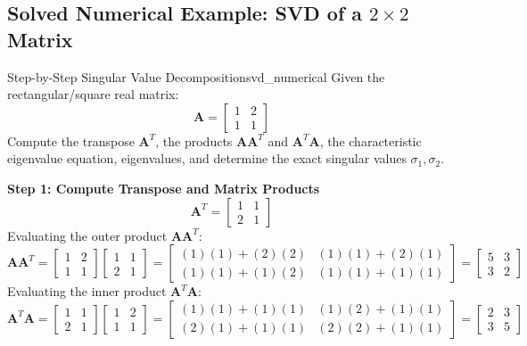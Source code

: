 \subsection{Solved Numerical Example: SVD of a \texorpdfstring{$2 \times 2$}{2 x 2} Matrix}

\begin{example}{Step-by-Step Singular Value Decomposition}{svd_numerical}
Given the rectangular/square real matrix:
\begin{equation}
    \mathbf{A} = \begin{bmatrix} 1 & 2 \\ 1 & 1 \end{bmatrix}
\end{equation}
Compute the transpose $\mathbf{A}^T$, the products $\mathbf{A}\mathbf{A}^T$ and $\mathbf{A}^T\mathbf{A}$, the characteristic eigenvalue equation, eigenvalues, and determine the exact singular values $\sigma_1, \sigma_2$.

\tcblower
\textbf{Step 1: Compute Transpose and Matrix Products}
\begin{equation}
    \mathbf{A}^T = \begin{bmatrix} 1 & 1 \\ 2 & 1 \end{bmatrix}
\end{equation}
Evaluating the outer product $\mathbf{A} \mathbf{A}^T$:
\begin{equation}
    \mathbf{A}\mathbf{A}^T = \begin{bmatrix} 1 & 2 \\ 1 & 1 \end{bmatrix} \begin{bmatrix} 1 & 1 \\ 2 & 1 \end{bmatrix} = \begin{bmatrix} (1)(1) + (2)(2) & (1)(1) + (2)(1) \\ (1)(1) + (1)(2) & (1)(1) + (1)(1) \end{bmatrix} = \begin{bmatrix} 5 & 3 \\ 3 & 2 \end{bmatrix}
\end{equation}
Evaluating the inner product $\mathbf{A}^T \mathbf{A}$:
\begin{equation}
    \mathbf{A}^T\mathbf{A} = \begin{bmatrix} 1 & 1 \\ 2 & 1 \end{bmatrix} \begin{bmatrix} 1 & 2 \\ 1 & 1 \end{bmatrix} = \begin{bmatrix} (1)(1) + (1)(1) & (1)(2) + (1)(1) \\ (2)(1) + (1)(1) & (2)(2) + (1)(1) \end{bmatrix} = \begin{bmatrix} 2 & 3 \\ 3 & 5 \end{bmatrix}
\end{equation}


\end{example}
